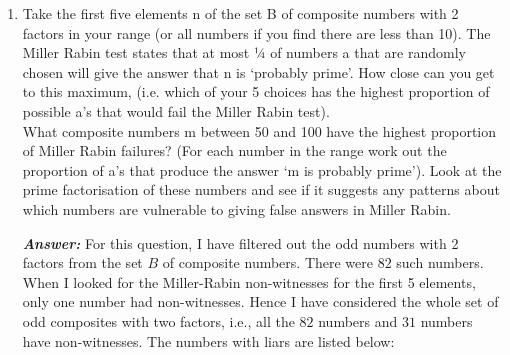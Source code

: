 \documentclass[11pt,a4paper]{article}
\begin{document}
\begin{enumerate}[1.]
\begin{flushleft}
\begin{enumerate}[(a)]
			The below code snippet is the implementation of the above criteria:

			\begin{lstlisting}[
					style={mystyle},
					caption={Carmichael Number Check - Korselt's criteria},
					label={carmichael-korselt}
				]

				///
				/// Carmichael Numbers using Korselt's criteria
				/// n: a composite number
				///
				pub fn carmichael_nums_korselt(n: &BigInt) -> bool {
					// initialisation to search prime factors
					let mut primes = vec![BigInt::from(2u64)];
					// prime factorisation of `n`
					let p_factors = n.prime_factors(&mut primes);
					// checking if the number is squarefree
					let squarefree = p_factors.iter().fold(true, |squarefree: bool, factor| {
						squarefree & (factor.1 == 1)
					});

					let mut p_m_o_divides_n_m_o = true;
					// if the number is squarefree, then check if `p minus one` divides `n minus one`
					if squarefree {
						let n_minus_one = n - 1;
						for (p, _) in p_factors.iter() {
							p_m_o_divides_n_m_o &= &n_minus_one % (p - 1) == BigInt::zero();
						}
					}

					// if both are true, return true
					squarefree & p_m_o_divides_n_m_o
				}
			\end{lstlisting}
			\end{enumerate}
		\end{flushleft}


		\item Take the first five elements n of the set B of composite numbers with 2 factors in your range (or all numbers if you find there are less than 10). The Miller Rabin test states that at most ¼ of numbers a that are randomly chosen will give the answer that n is ‘probably prime’. How close can you get to this maximum, (i.e. which of your 5 choices has the highest proportion of possible a’s that would fail the Miller Rabin test). \\
		\smallbreak
		What composite numbers m between 50 and 100 have the highest proportion of Miller Rabin failures? (For each number in the range work out the proportion of a’s that produce the answer ‘m is probably prime’). Look at the prime factorisation of these numbers and see if it suggests any patterns about which numbers are vulnerable to giving false answers in Miller Rabin.

		\begin{flushleft}
			\textbf{\textit{Answer:}} For this question, I have filtered out the odd numbers with 2 factors from the set $B$ of composite numbers. There were $82$ such numbers. When I looked for the Miller-Rabin non-witnesses for the first 5 elements, only one number had non-witnesses. Hence I have considered the whole set of odd composites with two factors, i.e., all the $82$ numbers and $31$ numbers have non-witnesses. The numbers with liars are listed below:


\end{flushleft}
\end{enumerate}
\end{document}
